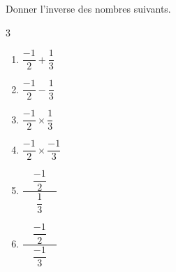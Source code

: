 \begin{exo}{}
	Donner l'inverse des nombres suivants.
	\vspace*{-2mm}
	\begin{multicols}{3}
		\begin{enumerate}
			\item $\dfrac{-1}{2} + \dfrac{1}{3}$
			\item $\dfrac{-1}{2} - \dfrac{1}{3}$
			\item $\dfrac{-1}{2} \times \dfrac{1}{3}$
			\item $\dfrac{-1}{2} \times \dfrac{-1}{3}$
			\item $\dfrac{\quad\dfrac{-1}{2}\quad}{\dfrac{1}{3}}$
			\item $\dfrac{\quad\dfrac{-1}{2}\quad}{\dfrac{-1}{3}}$
		\end{enumerate}
	\end{multicols}\vspace*{-2mm}
\end{exo}

